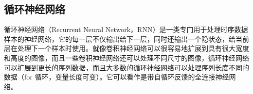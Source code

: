 \begin{comment}
\subsection{数据集准备}

在机器学习算法中，一般会准备3种数据集，分别是训练数据集、验证数据集和测试数据集。他们三个数据集完全不同，他们的作用也各不相同。训练数据集顾名思义用来训练神经网络算法，使得神经网络算法能够从中学习到数据的特性或特征。而验证数据集则用来检验神经网络学习效果，如果神经网络算法也能够正确辨别验证数据集，证明该算法正走向正确标签的类别，如果不能正确辨识验证数据集，则会用来惩罚该学习过程，使得学习过程能够修正方向。故而训练数据和验证数据一般是独立同分布（Independently Identically Distribution, IID )的数据构成。最后是测试数据集，这个一般是正式应用的数据集打包而成。而且最接近真实应用场景的数据，它一般只经过最少的数据预处理，用于检验前面训练得到的神经网络算法是否具备真实辨识能力和能做到什么样的程度。

在这个过程中，其实假设了真实数据的分布信息蕴含在数据中，但是有时候真实数据量很少，并不能完全分割为三种数据集，且我们并不知道数据真实分部信息。所以采用了模拟的数据集，假设了数据服从更宽泛的分布范围，神经网络算法能从中学习，且能够应该于真实分布的测试数据。故而，我们采用的训练数据要尽可能采用更宽泛的分布模拟数据，用于检验该算法学习效果的验证数据集也采用跟训练数据一样的分布信息。测试数据集采用真实的观测数据或者最接近真实的模拟数据。具体来说，在本论文中，训练数据和验证数据中波形是采用同样随机分布得到所有引力波源参数（如中心黑洞质量都是采用log分布）产生的EMRI波形，而测试数据集则采用天文学模型得到引力波源参数来产生EMRI波形。之后都是以同样方式叠加模拟的高斯噪声，用来作为正样本。在三种数据集中的负样本都是同样方法产生的随机高斯噪声。
\end{comment}

\subsection{循环神经网络}
循环神经网络（Recurrent Neural Network，RNN）是一类专门用于处理时序数据样本的神经网络，它的每一层不仅输出给下一层，同时还输出一个隐状态，给当前层在处理下一个样本时使用。就像卷积神经网络可以很容易地扩展到具有很大宽度和高度的图像，而且一些卷积神经网络还可以处理不同尺寸的图像，循环神经网络可以扩展到更长的序列数据，而且大多数的循环神经网络可以处理序列长度不同的数据（for 循环，变量长度可变）。它可以看作是带自循环反馈的全连接神经网络。

